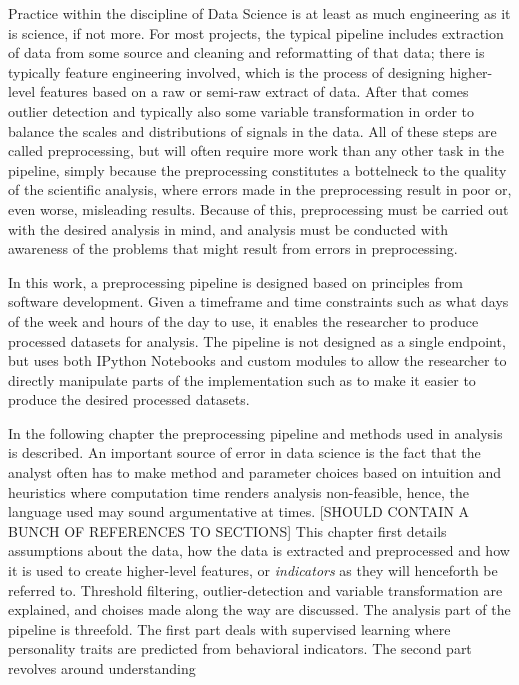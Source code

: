 Practice within the discipline of Data Science is at least as much engineering as it is science, if not more. For most projects, the typical pipeline includes extraction of data from some source and cleaning and reformatting of that data; there is typically feature engineering involved, which is the process of designing higher-level features based on a raw or semi-raw extract of data. After that comes outlier detection and typically also some variable transformation in order to balance the scales and distributions of signals in the data. All of these steps are called preprocessing, but will often require more work than any other task in the pipeline, simply because the preprocessing constitutes a bottelneck to the quality of the scientific analysis, where errors made in the preprocessing result in poor or, even worse, misleading results. Because of this, preprocessing must be carried out with the desired analysis in mind, and analysis must be conducted with awareness of the problems that might result from errors in preprocessing.

In this work, a preprocessing pipeline is designed based on principles from software development. Given a timeframe and time constraints such as what days of the week and hours of the day to use, it enables the researcher to produce processed datasets for analysis. The pipeline is not designed as a single endpoint, but uses both IPython Notebooks and custom modules to allow the researcher to directly manipulate parts of the implementation such as to make it easier to produce the desired processed datasets. 

In the following chapter the preprocessing pipeline and methods used in analysis is described. An important source of error in data science is the fact that the analyst often has to make method and parameter choices based on intuition and heuristics where computation time renders analysis non-feasible, hence, the language used may sound argumentative at times. [SHOULD CONTAIN A BUNCH OF REFERENCES TO SECTIONS] This chapter first details assumptions about the data, how the data is extracted and preprocessed and how it is used to create higher-level features, or \textit{indicators} as they will henceforth be referred to. Threshold filtering, outlier-detection and variable transformation are explained, and choises made along the way are discussed. The analysis part of the pipeline is threefold. The first part deals with supervised learning where personality traits are predicted from behavioral indicators. The second part revolves around understanding 